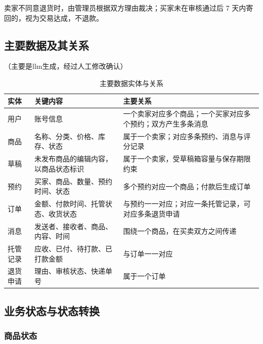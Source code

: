 \documentclass[UTF8,a4paper,zihao=-4]{ctexart}
\begin{document}
卖家不同意退货时，由管理员根据双方理由裁决；买家未在审核通过后 7 天内寄回的，视为交易达成，不退款。

\subsection{主要数据及其关系}
（主要是llm生成，经过人工修改确认）
\begin{table}[H]
\centering
\caption{主要数据实体与关系}
\begin{tabular}{p{2.2cm}p{5.4cm}p{6.6cm}}
\toprule
实体 & 关键内容 & 主要关系 \\
\midrule
用户 & 账号信息 & 一个卖家对应多个商品；一个买家对应多个预约；双方产生多条消息 \\
商品 & 名称、分类、价格、库存、状态 & 属于一个卖家；对应多条预约、消息与评分记录 \\
草稿 & 未发布商品的编辑内容，以商品状态标识 & 属于一个卖家，受草稿箱容量与保存期限约束 \\
预约 & 买家、商品、数量、预约时间、状态 & 多个预约对应一个商品；付款后生成订单 \\
订单 & 金额、付款时间、托管状态、收货状态 & 与预约一一对应；对应一条托管记录，可对应多条退货申请 \\
消息 & 发送者、接收者、商品、内容、时间 & 围绕一个商品，在买卖双方之间传递 \\
托管记录 & 应收、已付、待打款、已打款金额 & 与订单一一对应 \\
退货申请 & 理由、审核状态、快递单号 & 属于一个订单 \\
\bottomrule
\end{tabular}
\end{table}

\subsection{业务状态与状态转换}

\subsubsection{商品状态}
\end{document}

